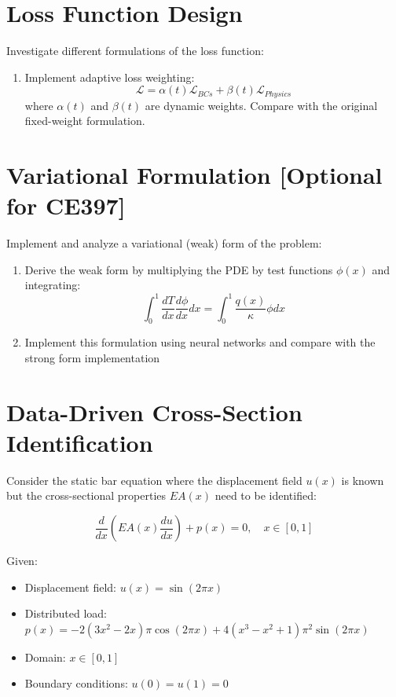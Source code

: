 \documentclass[11pt]{article}
\begin{document}
	\section{Loss Function Design}
	Investigate different formulations of the loss function:
	
	\begin{enumerate}
		\item[\textbf{a)}] Implement adaptive loss weighting:
		\begin{equation*}
			\mathcal{L} = \alpha(t)\mathcal{L}_{BCs} + \beta(t)\mathcal{L}_{Physics}
		\end{equation*}
		where $\alpha(t)$ and $\beta(t)$ are dynamic weights.  Compare with the original fixed-weight formulation. 
	\end{enumerate}
	
	\section{Variational Formulation [Optional for CE397]}
	Implement and analyze a variational (weak) form of the problem:
	
	\begin{enumerate}
		\item[\textbf{a)}] Derive the weak form by multiplying the PDE by test functions $\phi(x)$ and integrating:
		\begin{equation*}
			\int_0^1 \frac{dT}{dx}\frac{d\phi}{dx}dx = \int_0^1 \frac{q(x)}{\kappa}\phi dx
		\end{equation*}
		
		\item[\textbf{b)}] Implement this formulation using neural networks
		and compare with the strong form implementation 
	\end{enumerate}
	

	\section{Data-Driven Cross-Section Identification}
	Consider the static bar equation where the displacement field $u(x)$ is known but the cross-sectional properties $EA(x)$ need to be identified:
	
	\begin{equation*}
		\frac{d}{dx}(EA(x)\frac{du}{dx}) + p(x) = 0, \quad x \in [0,1]
	\end{equation*}
	
	Given:
	\begin{itemize}
		\item Displacement field: $u(x) = \sin(2\pi x)$
		\item Distributed load: $p(x) = -2(3x^2 - 2x)\pi \cos(2\pi x) + 4(x^3 - x^2 + 1)\pi^2 \sin(2\pi x)$
		\item Domain: $x \in [0,1]$
		\item Boundary conditions: $u(0) = u(1) = 0$
	\end{itemize}
	
\end{document}
